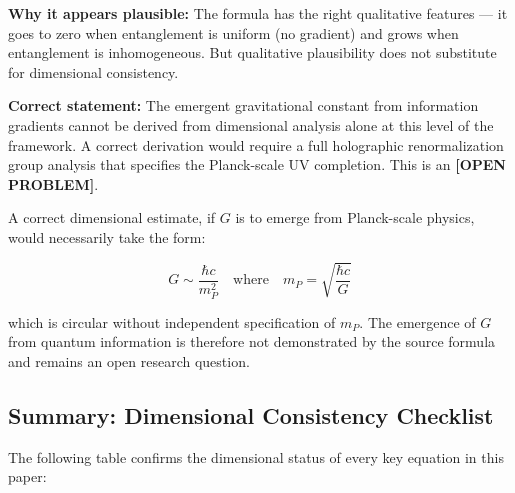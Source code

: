 \begin{framed}
\noindent\textbf{Why it appears plausible:} The formula has the right
qualitative features --- it goes to zero when entanglement is uniform
(no gradient) and grows when entanglement is inhomogeneous. But
qualitative plausibility does not substitute for dimensional consistency.

\noindent\textbf{Correct statement:} The emergent gravitational constant
from information gradients cannot be derived from dimensional analysis
alone at this level of the framework. A correct derivation would
require a full holographic renormalization group analysis that
specifies the Planck-scale UV completion. This is an
\textbf{[OPEN PROBLEM]}.

A correct dimensional estimate, if $G$ is to emerge from Planck-scale
physics, would necessarily take the form:

\begin{equation}
    G \sim \frac{\hbar c}{m_P^2}
    \quad \text{where}\quad m_P = \sqrt{\frac{\hbar c}{G}}
    \label{eq:G_planck}
\end{equation}

\noindent which is circular without independent specification of $m_P$.
The emergence of $G$ from quantum information is therefore not
demonstrated by the source formula and remains an open research question.
\end{framed}

\subsection{Summary: Dimensional Consistency Checklist}
\label{subsec:dim_summary}

The following table confirms the dimensional status of every key equation
in this paper:

